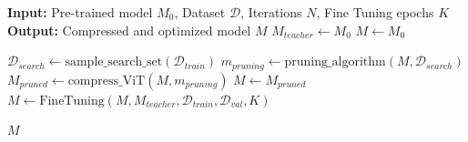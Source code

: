 \begin{algorithm}[H]
\caption{Framework di Compressione Iterativo}
\label{alg:framework_completo}
\begin{algorithmic}[1]
    \State \textbf{Input:} Pre-trained model $M_0$, Dataset $\mathcal{D}$, Iterations $N$, Fine Tuning epochs $K$
    \State \textbf{Output:} Compressed and optimized model $M$
    \State $M_{teacher} \gets M_0$ 
    \State $M \gets M_0$
    
        \State $\mathcal{D}_{search} \gets \text{sample\_search\_set}(\mathcal{D}_{train})$ 
        \State $m_{pruning} \gets \text{pruning\_algorithm}(M, \mathcal{D}_{search})$ 
        \State $M_{pruned} \gets \text{compress\_ViT}(M, m_{pruning})$ 
        \State $M \gets M_{pruned}$ 
        \State $M \gets \text{FineTuning}(M, M_{teacher}, \mathcal{D}_{train}, \mathcal{D}_{val}, K)$
    \EndFor
    
    \State \Return $M$
\end{algorithmic}
\end{algorithm}

